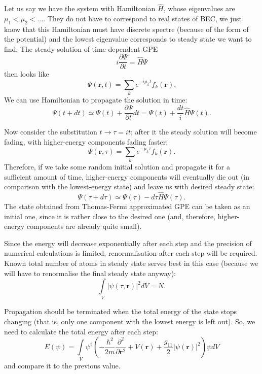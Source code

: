 \documentclass[12pt,notitlepage]{report}
\begin{document}
Let us say we have the system with Hamiltonian $\hat{H}$, whose eigenvalues are $\mu_1 < \mu_2 < ...$. They do not have to correspond to real states of BEC, we just know that this Hamiltonian must have discrete spectre (because of the form of the potential) and the lowest eigenvalue corresponds to steady state we want to find. The steady solution of time-dependent GPE
\[ i \frac{\partial \Psi}{\partial t} = \hat{H} \Psi \]
then looks like
\[ \Psi(\mathbf{r}, t) = \sum_k e^{-i \mu_k t} f_k(\mathbf{r}). \]
We can use Hamiltonian to propagate the solution in time:
\[ 
\Psi(t + dt) \simeq \Psi(t) + \frac{\partial \Psi}{\partial t} dt =
\Psi(t) + \frac{dt}{i} \hat{H} \Psi(t).
\]

Now consider the substitution $t \rightarrow \tau = it$; after it the steady solution will become fading, with higher-energy components fading faster:
\begin{equation}
\label{split_step_steady_state:general_solution_imaginary_time}
\Psi(\mathbf{r}, \tau) = \sum_k e^{-\mu_k \tau} f_k(\mathbf{r}).
\end{equation}
Therefore, if we take some random initial solution and propagate it for a sufficient amount of time, higher-energy components will eventually die out (in comparison with the lowest-energy state) and leave us with desired steady state:
\begin{equation}
\label{split_step_steady_state:iterative_process}
\Psi(\tau + d\tau) \simeq \Psi(\tau) - d\tau \hat{H} \Psi(\tau).
\end{equation}
The state obtained from Thomas-Fermi approximated GPE can be taken as an initial one, since it is rather close to the desired one (and, therefore, higher-energy components are already quite small).

Since the energy will decrease exponentially after each step and the precision of numerical calculations is limited, renormalisation after each step will be required. Known total number of atoms in steady state serves best in this case (because we will have to renormalise the final steady state anyway):
\[ \int\limits_V \vert \psi(\tau, \mathbf{r}) \vert^2 dV = N. \]

Propagation should be terminated when the total energy of the state stops changing (that is, only one component with the lowest energy is left out). So, we need to calculate the total energy after each step:
\[ E(\psi) = \int\limits_V \psi^\dagger \left(
-\frac{\hbar^2}{2m} \frac{\partial^2}{\partial \mathbf{r}^2} + V(\mathbf{r}) +
\frac{g_{11}}{2} \vert \psi(\mathbf{r}) \vert^2 \right) \psi dV \]
and compare it to the previous value.
\end{document}

